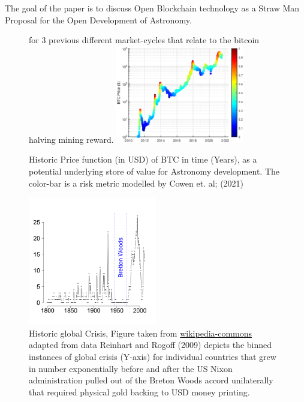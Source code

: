 \documentclass[final,5p,times,twocolumn,authoryear]{elsarticle}
\begin{document}
The goal of the paper is to discuss Open Blockchain technology as a Straw Man Proposal for the Open Development of Astronomy.
 \begin{figure}[h!]
    \centering
    \label{fig:cowenbtc}
  \caption{Historic Price function (in USD) of BTC in time (Years), as a potential underlying store of value for Astronomy development. The color-bar is a risk metric modelled by Cowen et. al; (2021)} for 3 previous different market-cycles that relate to the bitcoin halving mining reward.
  \includegraphics[width=0.5\textwidth]{figs/cowenbtc.eps}
\end{figure}

\begin{figure}[h!]
    \centering
    \label{fig:crisis}
  \caption{Historic global Crisis, Figure taken from \href{https://en.wikipedia.org/wiki/Global_recession}{wikipedia-commons} adapted from data Reinhart and Rogoff (2009) depicts the binned instances of global crisis (Y-axis) for individual countries that grew in number exponentially before and after the US Nixon administration pulled out of the Breton Woods accord unilaterally that required physical gold backing to USD money printing.}
  \includegraphics[width=0.5\textwidth]{figs/330px-BankingCrises.svg.png}
\end{figure}
\end{document}
